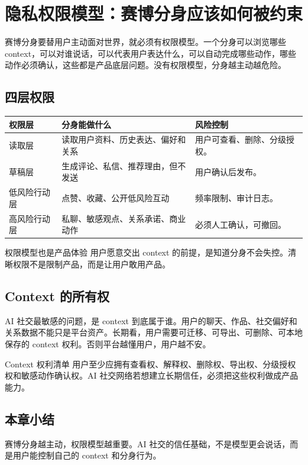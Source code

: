 \section{隐私权限模型：赛博分身应该如何被约束}

赛博分身要替用户主动面对世界，就必须有权限模型。一个分身可以浏览哪些 context，可以对谁说话，可以代表用户表达什么，可以自动完成哪些动作，哪些动作必须确认，这些都是产品底层问题。没有权限模型，分身越主动越危险。

\subsection{四层权限}

\noindent\begin{tabularx}{\textwidth}{p{}p{}X}
\toprule
权限层 & 分身能做什么 & 风险控制 \\
\midrule
读取层 & 读取用户资料、历史表达、偏好和关系 & 用户可查看、删除、分级授权。 \\
草稿层 & 生成评论、私信、推荐理由，但不发送 & 用户确认后发布。 \\
低风险行动层 & 点赞、收藏、公开低风险互动 & 频率限制、审计日志。 \\
高风险行动层 & 私聊、敏感观点、关系承诺、商业动作 & 必须人工确认，可撤回。 \\
\bottomrule
\end{tabularx}

\begin{knowledgebox}{权限模型也是产品体验}
用户愿意交出 context 的前提，是知道分身不会失控。清晰权限不是限制产品，而是让用户敢用产品。
\end{knowledgebox}

\subsection{Context 的所有权}

AI 社交最敏感的问题，是 context 到底属于谁。用户的聊天、作品、社交偏好和关系数据不能只是平台资产。长期看，用户需要可迁移、可导出、可删除、可本地保存的 context 权利。否则平台越懂用户，用户越不安。

\begin{importantbox}{Context 权利清单}
用户至少应拥有查看权、解释权、删除权、导出权、分级授权权和敏感动作确认权。AI 社交网络若想建立长期信任，必须把这些权利做成产品能力。
\end{importantbox}

\subsection{本章小结}

赛博分身越主动，权限模型越重要。AI 社交的信任基础，不是模型更会说话，而是用户能控制自己的 context 和分身行为。

